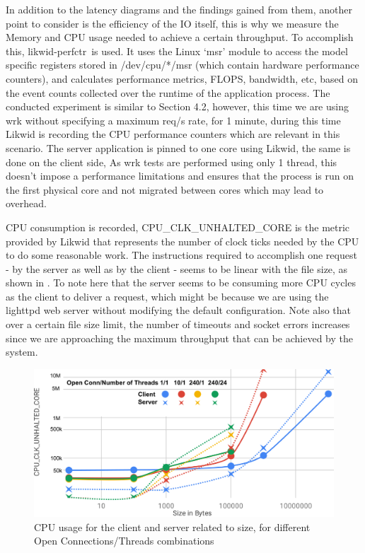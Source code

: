 \documentclass[runningheads]{llncs}
\begin{document}
In addition to the latency diagrams and the findings gained from them, another point to consider is the efficiency of the IO itself, this is why we measure the Memory and CPU usage needed to achieve a certain throughput. To accomplish this, likwid-perfctr\,\cite{likwid} is used. It uses the Linux ‘msr’ module to access the model specific registers stored in /dev/cpu/*/msr (which contain hardware performance counters), and calculates performance metrics, FLOPS, bandwidth, etc, based on the event counts collected over the runtime of the application process.
The conducted experiment is similar to Section 4.2, however, this time we are using wrk\cite{wrkURL} without specifying a maximum req/s rate, for 1 minute, during this time Likwid is recording the CPU performance counters which are relevant in this scenario. The server application is pinned to one core using Likwid, the same is done on the client side, As wrk tests are performed using only 1 thread, this doesn’t impose a performance limitations and ensures that the process is run on the first physical core and not migrated between cores which may lead to overhead. 

CPU consumption is recorded, CPU\_CLK\_UNHALTED\_CORE is the metric provided by Likwid that represents the number of clock ticks needed by the CPU to do some reasonable work. The instructions required to accomplish one request - by the server as well as by the client - seems to be linear with the file size, as shown in . To note here that the server seems to be consuming more CPU cycles as the client to deliver a request, which might be because we are using the lighttpd web server without modifying the default configuration. Note also that over a certain file size limit, the number of timeouts and socket errors increases since we are approaching the maximum throughput that can be achieved by the system.

\begin{figure}
\includegraphics[width=\textwidth]{cuc-to-size.png}
\caption{CPU usage for the client and server related to size, for different Open Connections/Threads combinations}
\label{fig:cuc-to-size}
\end{figure}
\end{document}
